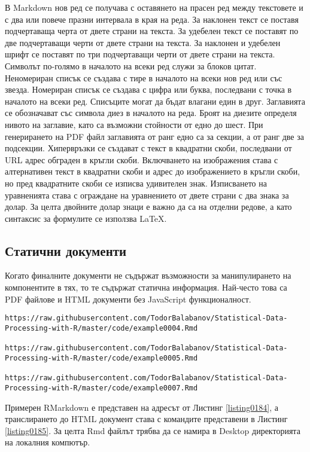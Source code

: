 В Markdown нов ред се получава с оставянето на прасен ред между текстовете и с два или повече празни интервала в края на реда. За наклонен текст се поставя подчертаваща черта от двете страни на текста. За удебелен текст се поставят по две подчертаващи черти от двете страни на текста. За наклонен и удебелен шрифт се поставят по три подчертаващи черти от двете страни на текста. Символът по-голямо в началото на всеки ред служи за блоков цитат. Неномериран списък се създава с тире в началото на всеки нов ред или със звезда. Номериран списък се създава с цифра или буква, последвани с точка в началото на всеки ред. Списъците могат да бъдат влагани един в друг. Заглавията се обозначават със символа диез в началото на реда. Броят на диезите определя нивото на заглавие, като са възможни стойности от едно до шест. При генерирането на PDF файл заглавията от ранг едно са за секции, а от ранг две за подсекции. Хипервръзки се създават с текст в квадратни скоби, последвани от URL адрес обграден в кръгли скоби. Включването на изображения става с алтернативен текст в квадратни скоби и адрес до изображението в кръгли скоби, но пред квадратните скоби се изписва удивителен знак. Изписването на уравненията става с ограждане на уравнението от двете страни с два знака за долар. За целта двойните долар знаци е важно да са на отделни редове, а като синтаксис за формулите се използва LaTeX. 

\subsection{Статични документи}

Когато финалните документи не съдържат възможности за манипулирането на компонентите в тях, то те съдържат статична информация. Най-често това са PDF файлове и HTML документи без JavaScript функционалност.

\begin{lstlisting}[caption=Адрес на примерни RMarkdown документ, label=listing0184]
https://raw.githubusercontent.com/TodorBalabanov/Statistical-Data-Processing-with-R/master/code/example0004.Rmd

https://raw.githubusercontent.com/TodorBalabanov/Statistical-Data-Processing-with-R/master/code/example0005.Rmd

https://raw.githubusercontent.com/TodorBalabanov/Statistical-Data-Processing-with-R/master/code/example0007.Rmd
\end{lstlisting}

Примерен RMarkdown е представен на адресът от Листинг \ref{listing0184}, а транслирането до HTML документ става с командите представени в Листинг \ref{listing0185}. За целта Rmd файлът трябва да се намира в Desktop директорията на локалния компютър. 

